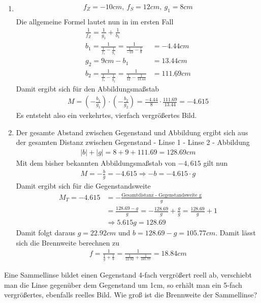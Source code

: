\documentclass[12pt,a4paper,ngerman]{article}
\begin{document}
\begin{enumerate}
\item \begin{align*}
f_Z = -10cm, \ f_S = 12cm, \ g_1 = 8cm \\
\end{align*}
Die allgemeine Formel lautet nun in im ersten Fall
\begin{align*}
\frac{1}{f_Z} = \frac{1}{g_1} + \frac{1}{b_1} \\
b_1 = \frac{1}{\frac{1}{f_z}-\frac{1}{g_1}} = \frac{1}{\frac{1}{-10}-\frac{1}{8}} &= -4.44 cm \\
g_2 = 9cm - b_1 &= 13.44cm \\
b_2 = \frac{1}{\frac{1}{f_s}-\frac{1}{g_2}} = \frac{1}{\frac{1}{12} - \frac{1}{13.44}} &= \underline{111.69cm}
\end{align*}
Damit ergibt sich für den Abbildungsmaßstab
\begin{align*}
M = \left(-\frac{b_1}{g_1}\right) \cdot \left(-\frac{b_2}{g_2}\right) = \frac{-4.44}{8} \cdot \frac{111.69}{13.44} = -4.615
\end{align*}
Es entsteht also ein verkehrtes, vierfach vergrößertes Bild. 
\item Der gesamte Abstand zwischen Gegenstand und Abbildung ergibt sich aus der gesamten Distanz zwischen Gegenstand - Linse 1 - Linse 2 - Abbildung
\begin{align*}
|b| + |g| = 8 + 9 + 111.69 = 128.69cm
\end{align*}
Mit dem bisher bekannten Abbildungsmaßstab von $-4,615$ gilt nun
\begin{align*}
M = -\frac{b}{g} = -4.615 \Rightarrow -b = -4.615 \cdot g
\end{align*}
Damit ergibt sich für die Gegenstandsweite
\begin{align*}
M_T = -4.615 &= -\frac{\text{Gesamtdistanz - Gegenstandsweite g}}{g} \\ &=\frac{128.69-g}{g} = -\frac{128.69}{g} + \frac{g}{g} = \frac{128.69}{g} +1 \\  &\Rightarrow 5.615g = 128.69
\end{align*}
Damit folgt daraus $g=22.92cm$ und $b=128.69-g=105.77cm$. Damit lässt sich die Brennweite berechnen zu
\begin{align*}
f = \frac{1}{\frac{1}{g}+\frac{1}{b}} = \frac{1}{\frac{1}{22.92} + \frac{1}{105.77}} = 18.84 cm
\end{align*}
\end{enumerate}


\begin{framed}
 Eine Sammellinse bildet einen Gegenstand 4-fach vergrößert reell ab, verschiebt man die Linse gegenüber dem Gegenstand um 1cm, so erhält man ein 5-fach vergrößertes, ebenfalls reelles Bild. Wie groß ist die Brennweite der Sammellinse?
\end{framed}
\end{document}
